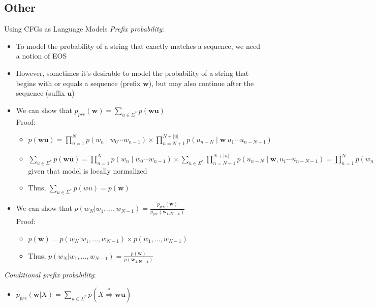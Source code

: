 \subsection*{Other}
Using CFGs as Language Models
\emph{Prefix probability}:
\begin{itemize}
    \item To model the probability of a string that exactly matches a sequence, we need a notion of EOS
    \item However, sometimes it's desirable to model the probability of a string that begins with or equals a sequence (prefix $\boldsymbol{w}$), but may also continue after the sequence (suffix $\boldsymbol{u}$)
    \item We can show that $p_{pre}(\mathbf{w}) = \sum_{u \in \Sigma^*} p(\boldsymbol{w}\boldsymbol{u})$\\
    Proof:
    \begin{itemize}
        \item $p(\boldsymbol{w}\boldsymbol{u}) = \prod_{n=1}^N p(w_n \mid w_0 \cdots w_{n-1}) \times \prod_{n=N+1}^{N+|u|} p(u_{n-N} \mid \boldsymbol{w} \ u_1 \cdots u_{n-N-1})$
        \item $\sum_{u \in \Sigma^*} p(\boldsymbol{w}\boldsymbol{u}) = \prod_{n=1}^N p(w_n \mid w_0 \cdots w_{n-1}) \times \sum_{u \in \Sigma^*} \prod_{n=N+1}^{N+|u|} p(u_{n-N} \mid \boldsymbol{w}, u_1 \cdots u_{n-N-1}) = \prod_{n=1}^N p(w_n \mid w_0 \cdots w_{n-1}) \times 1$ given that model is locally normalized
        \item Thus, $\sum_{u \in \Sigma^*} p(wu) = p(\mathbf{w})$
    \end{itemize}
    \item We can show that $p(w_N | w_1, ..., w_{N-1}) = \frac{p_{pre}(\mathbf{w})}{p_{pre}(\mathbf{w_{1:N-1}})} $\\
    Proof:
    \begin{itemize}
        \item $p(\mathbf{w})  = p(w_N | w_1, ..., w_{N-1}) \times p(w_1, ..., w_{N-1})$
        \item Thus, $p(w_N | w_1, ..., w_{N-1}) = \frac{p(\mathbf{w})}{p(\mathbf{w_{1:N-1}})}$
    \end{itemize}
\end{itemize}
\emph{Conditional prefix probability}:
\begin{itemize}
    \item $p_{pre}(\mathbf{w} | X) = \sum_{u \in \Sigma^*} p(X \stackrel{*}{\Rightarrow} \boldsymbol{w}\boldsymbol{u})$
\end{itemize}
